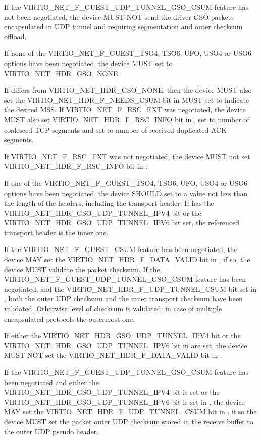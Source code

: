 If the VIRTIO_NET_F_GUEST_UDP_TUNNEL_GSO_CSUM feature has not been negotiated,
the device MUST NOT send the driver GSO packets encapsulated in UDP
tunnel and requiring segmentation and outer checksum offload.

If none of the VIRTIO_NET_F_GUEST_TSO4, TSO6, UFO, USO4 or USO6 options have
been negotiated, the device MUST set  to
VIRTIO_NET_HDR_GSO_NONE.

If  differs from VIRTIO_NET_HDR_GSO_NONE, then
the device MUST also set the VIRTIO_NET_HDR_F_NEEDS_CSUM bit in
 MUST set  to indicate the desired MSS.
If VIRTIO_NET_F_RSC_EXT was negotiated, the device MUST also
set VIRTIO_NET_HDR_F_RSC_INFO bit in ,
set  to number of coalesced TCP segments and
set  to number of received duplicated ACK segments.

If VIRTIO_NET_F_RSC_EXT was not negotiated, the device MUST
not set VIRTIO_NET_HDR_F_RSC_INFO bit in .

If one of the VIRTIO_NET_F_GUEST_TSO4, TSO6, UFO, USO4 or USO6 options have
been negotiated, the device SHOULD set  to a value
not less than the length of the headers, including the transport
header. If  has the VIRTIO_NET_HDR_GSO_UDP_TUNNEL_IPV4 bit
or the VIRTIO_NET_HDR_GSO_UDP_TUNNEL_IPV6 bit set, the referenced transport
header is the inner one.

If the VIRTIO_NET_F_GUEST_CSUM feature has been negotiated, the
device MAY set the VIRTIO_NET_HDR_F_DATA_VALID bit in
, if so, the device MUST validate the packet
checksum. If the VIRTIO_NET_F_GUEST_UDP_TUNNEL_GSO_CSUM feature has
been negotiated, and the VIRTIO_NET_HDR_F_UDP_TUNNEL_CSUM bit set in
, both the outer UDP checksum and the inner transport
checksum have been validated.
Otherwise level of checksum is validated: in case of multiple
encapsulated protocols the outermost one.

If either the VIRTIO_NET_HDR_GSO_UDP_TUNNEL_IPV4 bit or the
VIRTIO_NET_HDR_GSO_UDP_TUNNEL_IPV6 bit in  are set,
the device MUST NOT set the VIRTIO_NET_HDR_F_DATA_VALID bit in
.

If the VIRTIO_NET_F_GUEST_UDP_TUNNEL_GSO_CSUM feature has been negotiated
and either the VIRTIO_NET_HDR_GSO_UDP_TUNNEL_IPV4 bit is set or the
VIRTIO_NET_HDR_GSO_UDP_TUNNEL_IPV6 bit is set in , the
device MAY set the VIRTIO_NET_HDR_F_UDP_TUNNEL_CSUM bit in
, if so the device MUST set the packet outer UDP checksum
stored in the receive buffer to the outer UDP pseudo header.

